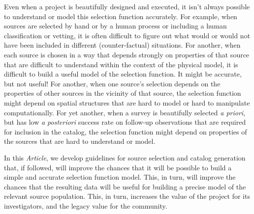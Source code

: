 \documentclass[modern]{aastex62}
\newcommand{\documentname}{\textsl{Article}}
\newcommand{\foreign}[1]{\textsl{#1}}
\begin{document}
Even when a project is beautifully designed and
executed, it isn't always possible to understand or model this
selection function accurately.
For example, when sources are selected by hand or by
a human process or including a human classification or vetting, it is often difficult to
figure out what would or would not have been included in different
(counter-factual) situations.
For another, when each source is chosen in a way that depends strongly
on properties of that source that are difficult to understand within
the context of the physical model, it is difficult to build a useful
model of the selection function.
It might be accurate, but not useful!
For another, when one source's selection depends on the properties
of other sources in the vicinity of that source, the selection
function might depend on spatial structures that are hard to model or
hard to manipulate computationally.
For yet another, when a survey is beautifully selected \foreign{a priori},
but has low
\foreign{a posteriori} success rate on follow-up observations that
are required for inclusion in the catalog, the selection
function might depend on properties of the sources that are hard to
understand or model.

In this \documentname, we develop guidelines for source selection and
catalog generation
that, if followed, will improve the chances that it will be possible
to build a simple and accurate selection function model.
This, in turn, will improve the chances that the resulting data
will be useful for building a precise model of the relevant source
population.
This, in turn, increases the value of the project for its investigators,
and the legacy value for the community.
\end{document}
